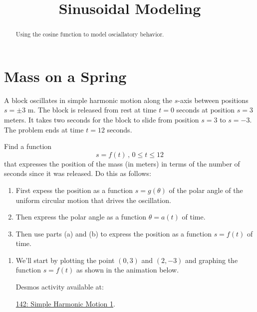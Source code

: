 \documentclass{ximera}
\title{Sinusoidal Modeling}
\begin{document}
\begin{abstract}
Using the cosine function to model osciallatory behavior.
\end{abstract}
\maketitle


\section{Mass on a Spring}
\begin{example}  \label{Efdbgthyn}
A block oscillates in simple harmonic motion along the $s$-axis between positions $s=\pm 3$ m. The block is released from rest at time $t=0$ seconds at position $s=3$ meters. It takes two seconds for the block to slide from position $s=3$ to $s=-3$. The problem ends at time $t=12$ seconds.

Find a function
\[
   s = f(t) \, , \, 0\leq t \leq 12
\]  
that expresses the position of the mass (in meters) in terms of the number of seconds since it was released. Do this as follows:

\begin{enumerate}
\item First expess the position as a function $s=g(\theta)$ of the polar angle of the uniform circular motion that drives the oscillation.

\item Then express the polar angle as a function $\theta = a(t)$ of time.

\item Then use parts (a) and (b) to express the position as a function $s=f(t)$ of time.
\end{enumerate}

\begin{explanation}

\begin{enumerate}

\item We'll start by plotting the point $(0,3)$ and $(2,-3)$ and graphing the function $s=f(t)$ as shown in the animation below. 

Desmos activity available at:

\href{https://www.desmos.com/calculator/ae793153a6}{142: Simple Harmonic Motion 1}.

 
\begin{onlineOnly}
    \begin{center}
\end{center}
\end{onlineOnly}


\end{enumerate}
\end{explanation}
\end{example}
\end{document}
